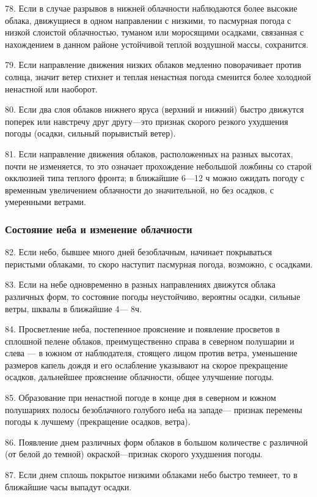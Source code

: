 78. Если в случае разрывов в нижней облачности наблюдаются более высокие облака, движущиеся в одном направлении с низкими, то пасмурная погода с низкой слоистой облачностью, туманом или моросящими осадками, связанная с нахождением в данном районе устойчивой теплой воздушной массы, сохранится.

79. Если направление движения низких облаков медленно поворачивает против солнца, значит ветер стихнет и теплая ненастная погода сменится более холодной ненастной или наоборот.

80. Если два слоя облаков нижнего яруса (верхний и нижний) быстро движутся поперек или навстречу друг другу—это признак скорого резкого ухудшения погоды (осадки, сильный порывистый ветер).

81. Если направление движения облаков, расположенных на разных высотах, почти не изменяется, то это означает прохождение небольшой ложбины со старой окклюзией типа теплого фронта; в ближайшие 6—12 ч можно ожидать погоду с временным увеличением облачности до значительной, но без осадков, с умеренными ветрами.

\subsubsection{Состояние неба и изменение облачности}

82. Если небо, бывшее много дней безоблачным, начинает покрываться перистыми облаками, то скоро наступит пасмурная погода, возможно, с осадками.

83. Если на небе одновременно в разных направлениях движутся облака различных форм, то состояние погоды неустойчиво, вероятны осадки, сильные ветры, шквалы в ближайшие 4— 8ч.

84. Просветление неба, постепенное прояснение и появление просветов в сплошной пелене облаков, преимущественно справа в северном полушарии и слева — в южном от наблюдателя, стоящего лицом против ветра, уменьшение размеров капель дождя и его ослабление указывают на скорое прекращение осадков, дальнейшее прояснение облачности, общее улучшение погоды.

85. Образование при ненастной погоде в конце дня в северном и южном полушариях полосы безоблачного голубого неба на западе— признак перемены погоды к лучшему (прекращение осадков, ветра).

86. Появление днем различных форм облаков в большом количестве с различной (от белой до темной) окраской—признак скорого ухудшения погоды.

87. Если днем сплошь покрытое низкими облаками небо быстро темнеет, то в ближайшие часы выпадут осадки.


